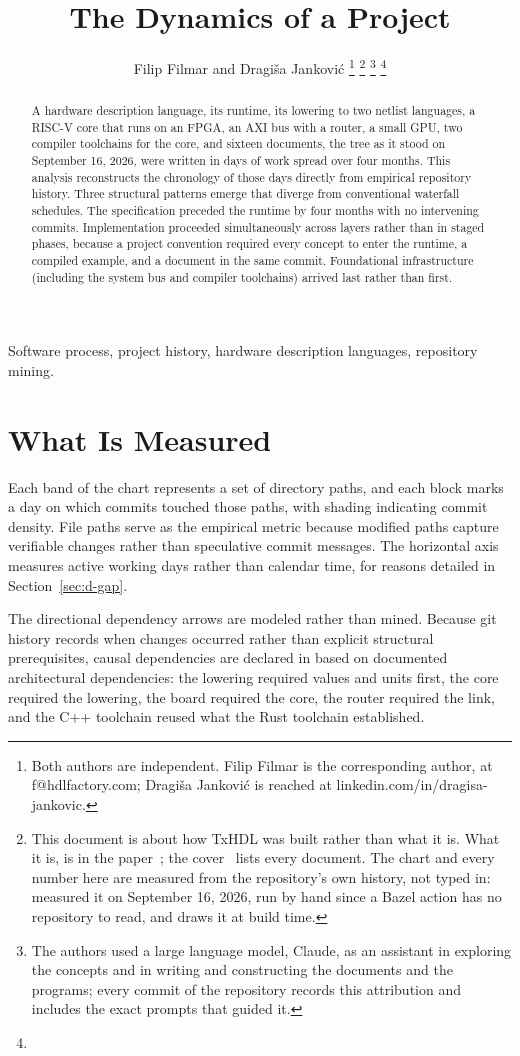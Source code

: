 \documentclass[journal,onecolumn,9pt]{IEEEtran}
\title{The Dynamics of a Project}
\author{Filip Filmar and Dragiša Janković%
\thanks{Both authors are independent. Filip Filmar is the
corresponding author, at f@hdlfactory.com; Dragiša Janković is
reached at linkedin.com/in/dragisa-jankovic.}%
\thanks{This document is about how TxHDL was built rather than what
it is. What it is, is in the paper~\cite{paper}; the
cover~\cite{cover} lists every document. The chart and every number
here are measured from the repository's own history, not typed in:
\code{//tools/timeline} measured it on September 16, 2026, run by hand
since a Bazel action has no repository to read, and
\code{//tools/gantt} draws it at build time.}%
\thanks{The authors used a large language model, Claude, as an
assistant in exploring the concepts and in writing and constructing
the documents and the programs; every commit of the repository records
this attribution and includes the exact prompts that guided it.}%
\thanks{\buildstamp}}
\begin{document}
\maketitle

\begin{abstract}
A hardware description language, its runtime, its lowering to two
netlist languages, a RISC-V core that runs on an FPGA, an AXI bus
with a router, a small GPU, two compiler toolchains for the core, and
sixteen documents, the tree as it stood on September 16, 2026, were
written in \ganttdays{} days of work spread over four months. This
analysis reconstructs the chronology of those \ganttdays{} days
directly from empirical repository history. Three structural patterns
emerge that diverge from conventional waterfall schedules. The
specification preceded the runtime by four months with no intervening
commits. Implementation proceeded simultaneously across layers rather
than in staged phases, because a project convention required every
concept to enter the runtime, a compiled example, and a document in
the same commit. Foundational infrastructure (including the system bus
and compiler toolchains) arrived last rather than first.
\end{abstract}

\begin{IEEEkeywords}
Software process, project history, hardware description languages,
repository mining.
\end{IEEEkeywords}

\section{What Is Measured}
\label{sec:d-what}

Each band of the chart represents a set of directory paths, and each
block marks a day on which commits touched those paths, with shading
indicating commit density. File paths serve as the empirical metric
because modified paths capture verifiable changes rather than
speculative commit messages. The horizontal axis measures active working
days rather than calendar time, for reasons detailed in
Section~\ref{sec:d-gap}.

The directional dependency arrows are modeled rather than mined.
Because git history records when changes occurred rather than explicit
structural prerequisites, causal dependencies are declared in
 based on documented architectural dependencies:
the lowering required values and units first, the core required the
lowering, the board required the core, the router required the link,
and the C++ toolchain reused what the Rust toolchain established.
\end{document}
